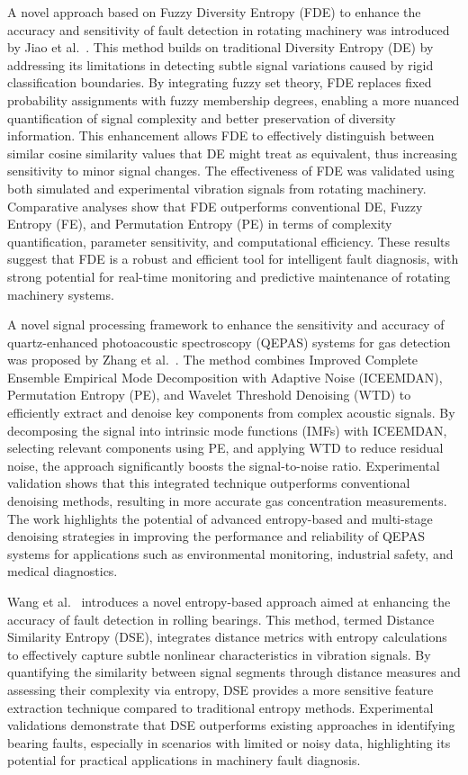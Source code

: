 A novel approach based on Fuzzy Diversity Entropy (FDE) to enhance the accuracy and sensitivity of fault detection in rotating machinery was introduced by Jiao et al.~\cite{Jiao2025}. This method builds on traditional Diversity Entropy (DE) by addressing its limitations in detecting subtle signal variations caused by rigid classification boundaries. By integrating fuzzy set theory, FDE replaces fixed probability assignments with fuzzy membership degrees, enabling a more nuanced quantification of signal complexity and better preservation of diversity information. This enhancement allows FDE to effectively distinguish between similar cosine similarity values that DE might treat as equivalent, thus increasing sensitivity to minor signal changes. The effectiveness of FDE was validated using both simulated and experimental vibration signals from rotating machinery. Comparative analyses show that FDE outperforms conventional DE, Fuzzy Entropy (FE), and Permutation Entropy (PE) in terms of complexity quantification, parameter sensitivity, and computational efficiency. These results suggest that FDE is a robust and efficient tool for intelligent fault diagnosis, with strong potential for real-time monitoring and predictive maintenance of rotating machinery systems.

A novel signal processing framework to enhance the sensitivity and accuracy of quartz-enhanced photoacoustic spectroscopy (QEPAS) systems for gas detection was proposed by Zhang et al.~\cite{Zhang2025}. The method combines Improved Complete Ensemble Empirical Mode Decomposition with Adaptive Noise (ICEEMDAN), Permutation Entropy (PE), and Wavelet Threshold Denoising (WTD) to efficiently extract and denoise key components from complex acoustic signals. By decomposing the signal into intrinsic mode functions (IMFs) with ICEEMDAN, selecting relevant components using PE, and applying WTD to reduce residual noise, the approach significantly boosts the signal-to-noise ratio. Experimental validation shows that this integrated technique outperforms conventional denoising methods, resulting in more accurate gas concentration measurements. The work highlights the potential of advanced entropy-based and multi-stage denoising strategies in improving the performance and reliability of QEPAS systems for applications such as environmental monitoring, industrial safety, and medical diagnostics.

Wang et al.~\cite{Wang2025} introduces a novel entropy-based approach aimed at enhancing the accuracy of fault detection in rolling bearings. This method, termed Distance Similarity Entropy (DSE), integrates distance metrics with entropy calculations to effectively capture subtle nonlinear characteristics in vibration signals. By quantifying the similarity between signal segments through distance measures and assessing their complexity via entropy, DSE provides a more sensitive feature extraction technique compared to traditional entropy methods. Experimental validations demonstrate that DSE outperforms existing approaches in identifying bearing faults, especially in scenarios with limited or noisy data, highlighting its potential for practical applications in machinery fault diagnosis.

